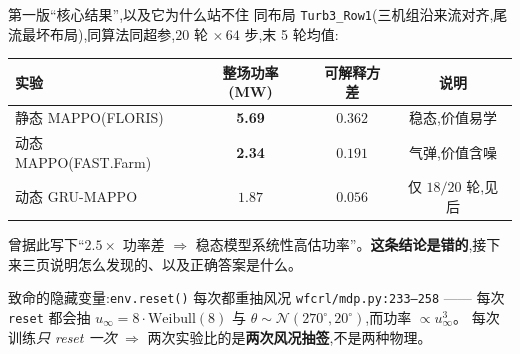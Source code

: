 \documentclass[aspectratio=169,11pt,UTF8]{ctexbeamer}
\newcommand{\wind}{u_{\infty}}
\newcommand{\emphb}[1]{\textcolor{myred}{\textbf{#1}}}
\begin{document}
\begin{frame}{第一版“核心结果”,以及它为什么站不住}
\small
同布局 \texttt{Turb3\_Row1}(三机组沿来流对齐,尾流最坏布局),同算法同超参,$20$ 轮 $\times\,64$ 步,末 5 轮均值:
\begin{center}\renewcommand{\arraystretch}{1.2}
\begin{tabular}{@{}lccc@{}}
\toprule
\textbf{实验} & \textbf{整场功率 (MW)} & \textbf{可解释方差} & \textbf{说明} \\
\midrule
静态 MAPPO(FLORIS)      & \textcolor{myblue}{\textbf{5.69}} & $0.362$ & 稳态,价值易学 \\
动态 MAPPO(FAST.Farm)   & \textcolor{myred}{\textbf{2.34}} & $0.191$ & 气弹,价值含噪 \\
动态 GRU-MAPPO          & $1.87$          & $0.056$ & 仅 $18/20$ 轮,见后 \\
\bottomrule
\end{tabular}
\end{center}
\vspace{1mm}
曾据此写下“$2.5\times$ 功率差 $\Rightarrow$ 稳态模型系统性高估功率”。\emphb{这条结论是错的},接下来三页说明怎么发现的、以及正确答案是什么。
\begin{alertblock}{致命的隐藏变量:\texttt{env.reset()} 每次都重抽风况}
\texttt{wfcrl/mdp.py:233--258} —— 每次 \texttt{reset} 都会抽
$\wind \!=\! 8\cdot\mathrm{Weibull}(8)$ 与 $\theta \!\sim\! \mathcal{N}(270^\circ,20^\circ)$,而功率 $\propto \wind^{3}$。
每次训练\emph{只 reset 一次} $\Rightarrow$ 两次实验比的是\textbf{两次风况抽签},不是两种物理。
\end{alertblock}
\end{frame}
\end{document}
